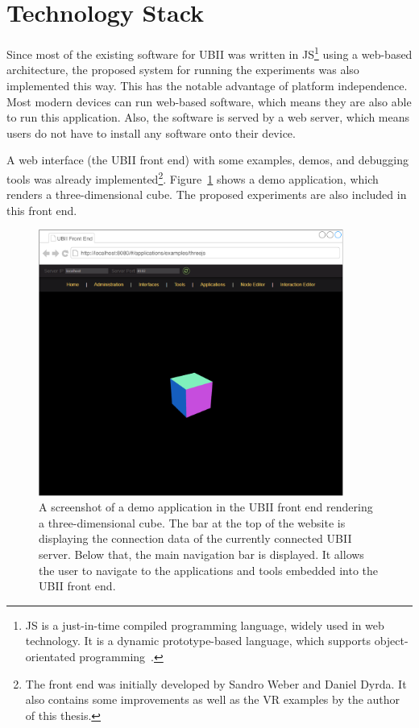 \section{Technology Stack}\label{section:technology-stack}

Since most of the existing software for \gls{UBII} was written in \gls{JS}\footnote{\gls{JS} is a just-in-time compiled programming language, widely used in web technology. It is a dynamic prototype-based language, which supports object-orientated programming~\cite[43, 47]{ECMAInternational.2018}.} using a web-based architecture, the proposed system for running the experiments was also implemented this way. This has the notable advantage of platform independence. Most modern devices can run web-based software, which means they are also able to run this application. Also, the software is served by a web server, which means users do not have to install any software onto their device.

A web interface (the \gls{UBII} front end) with some examples, demos, and debugging tools was already implemented\footnote{The front end was initially developed by Sandro Weber and Daniel Dyrda. It also contains some improvements as well as the \gls{VR} examples by the author of this thesis.}. Figure~\ref{fig:ubii-front-end} shows a demo application, which renders a three-dimensional cube. The proposed experiments are also included in this front end.

\begin{figure}[H]
	\centering
	\includegraphics[width=10cm]{figures/implementation/ubii_front_end.pdf}
	\caption[Screenshot of the front end]{A screenshot of a demo application in the UBII front end rendering a three-dimensional cube. The bar at the top of the website is displaying the connection data of the currently connected \gls{UBII} server. Below that, the main navigation bar is displayed. It allows the user to navigate to the applications and tools embedded into the \gls{UBII} front end.}\label{fig:ubii-front-end}
\end{figure}

